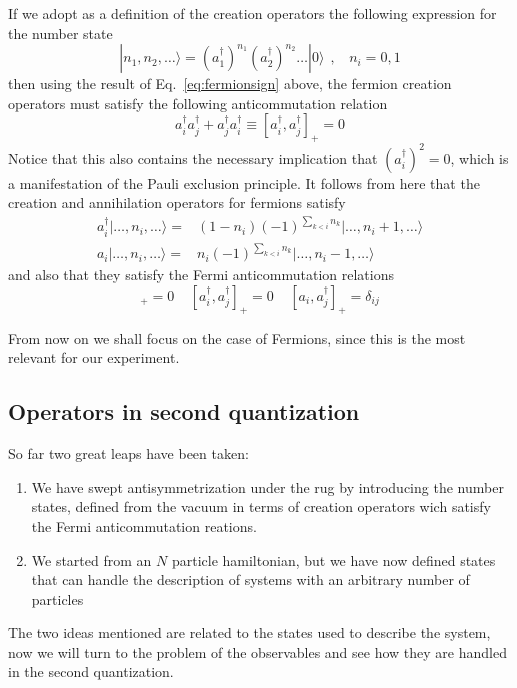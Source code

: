 \documentclass[11pt,letter]{article}
\begin{document}
If we adopt as a definition of the creation operators the following expression
for the number state \begin{equation}
  | n_{1}, n_{2}, \dots \rangle =  
   ( a_{1}^{\dagger} ) ^{n_{1}}  
   ( a_{2}^{\dagger} ) ^{n_{2}}  \ldots | 0 \rangle \ \ , \ \ \ \ n_{i}=0,1 
  \label{eq:numberstateFermions}
\end{equation}
then using the result of Eq.~\ref{eq:fermionsign} above, the fermion creation
operators must satisfy the following anticommutation relation 
\begin{equation}
 a_{i}^{\dagger}a_{j}^{\dagger} + a_{j}^{\dagger}a_{i}^{\dagger} 
  \equiv [a_{i}^{\dagger}, a_{j}^{\dagger}]_{+} = 0 
\end{equation}
Notice that this also contains the necessary implication that
$(a_{i}^{\dagger})^{2}=0$, which is a manifestation of the Pauli exclusion
principle.  It follows from here that the creation and annihilation operators
for fermions satisfy \begin{equation}
\begin{split}
  a_{i}^{\dagger}| \ldots, n_{i}, \ldots \rangle 
  =  & (1-n_{i})(-1)^{\sum_{k<i} n_{k}} | \ldots, n_{i}+1, \ldots \rangle \\
  a_{i}| \ldots, n_{i}, \ldots \rangle 
  =  & n_{i}(-1)^{\sum_{k<i} n_{k}} | \ldots, n_{i}-1, \ldots \rangle
\end{split} 
\end{equation}
and also that they satisfy the Fermi anticommutation relations 
\begin{equation}
  [a_{i}, a_{j}]_{+} = 0 \ \ \ \ \  
  [a_{i}^{\dagger}, a_{j}^{\dagger}]_{+} = 0 \ \ \ \ \   
  [a_{i},a_{j}^{\dagger}]_{+}=\delta_{ij}
\end{equation}

From now on we shall focus on the case of Fermions, since this is the most
relevant for our experiment.  

\subsection{Operators in second quantization}

So far two great leaps have been taken: 
\begin{enumerate}
 \item We have swept antisymmetrization under the rug by introducing the number
states, defined from the vacuum in terms of creation operators wich satisfy the
Fermi anticommutation reations.  
 \item We started from an $N$ particle hamiltonian, but we have now defined
states that can handle the description of systems with an arbitrary number of
particles 
\end{enumerate}
The two ideas mentioned are related to the states used to describe the system,
now we will turn to the problem of the observables and see how they are handled
in the second quantization.  
\end{document}
